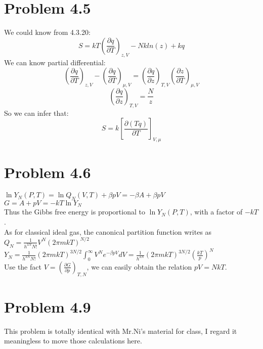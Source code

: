 \documentclass{article}
\begin{document}
\section*{Problem 4.5} %
\label{sec:problem_4_5}
	
	We could know from 4.3.20:
	$$S=kT(\frac{\partial q}{\partial T})_{z,V}-Nkln(z)+kq$$
	We can know partial differential:
	$$(\frac{\partial q}{\partial T})_{z,V}-(\frac{\partial q}{\partial T})_{\mu,V}=(\frac{\partial q}{\partial z})_{T,V}(\frac{\partial z}{\partial T})_{\mu,V}$$
	$$(\frac{\partial q}{\partial z})_{T,V}=\frac{N}{z}$$
	So we can infer that:
	$$S=k[\frac{\partial (Tq)}{\partial{T}}]_{V,\mu}$$
\section*{Problem 4.6}
$\ln{Y_N(P,T)}=\ln{Q_N(V,T)}+\beta pV=-\beta A+\beta pV$\\
$G=A+pV=-kT\ln{Y_N}$\\
Thus the Gibbs free energy is proportional to $\ln{Y_N(P,T)}$, with a factor of $-kT$.\\
As for classical ideal gas, the canonical partition function writes as $Q_N=\frac{1}{h^{3N}N!}V^N(2\pi mkT)^{N/2}$\\
$Y_N=\frac{1}{h^{3N}N!}(2\pi mkT)^{3N/2}\int_0^\infty{V^N e^{-\beta pV}dV}=\frac{1}{h^{3N}}(2\pi mkT)^{3N/2}(\frac{kT}{p})^N$\\
Use the fact $V=(\frac{\partial G}{\partial p})_{T,N}$, we can easily obtain the relation $pV=NkT$.\\




\section*{Problem 4.9}
This problem is totally identical with Mr.Ni's material for class, I regard it meaningless to move those calculations here.
\end{document}
